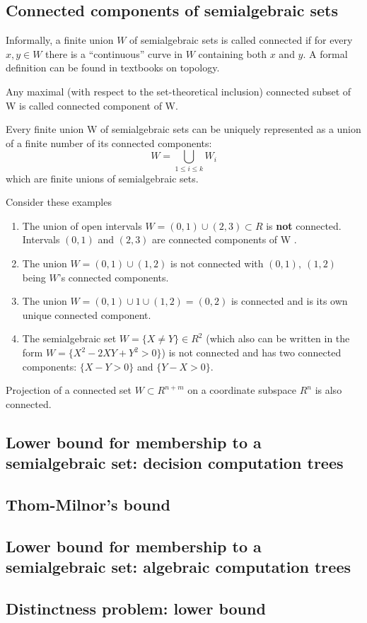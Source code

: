 \subsection{Connected components of semialgebraic sets}
Informally, a finite union $W$ of semialgebraic sets is called connected
if for every $x, y \in W$ there is a “continuous” curve in $W$ containing both $x$ and $y$.
A formal definition can be found in textbooks on topology.

\begin{definition}
    Any maximal (with respect to the set-theoretical inclusion) connected subset of W is called connected component of W.
\end{definition}

\begin{theorem}
    Every finite union W of semialgebraic sets can be uniquely represented as a union of a finite number of its connected components:
    $$W = \bigcup\limits_{1\leq i \leq k} W_i$$
    which are finite unions of semialgebraic sets.
\end{theorem}

\begin{example}
    Consider these examples
    \begin{enumerate}
        \item The union of open intervals $W = (0, 1) \cup (2, 3) \subset R$ is \textbf{not} connected.
            Intervals $(0, 1)$ and $(2, 3)$ are connected components of W .
        \item The union $W = (0, 1) \cup (1, 2)$ is not connected with $(0, 1),\ (1, 2)$ being $W$’s connected components.
        \item The union $W = (0, 1) \cup 1 \cup (1, 2) = (0, 2)$ is connected and is its own unique connected component.
        \item The semialgebraic set $W = \{X \neq Y \} \in R^2$
            (which also can be written in the form $W = \{X^2 − 2XY + Y^2 > 0\}$)
            is not connected and has two connected components: $\{X − Y > 0\}$ and $\{Y − X > 0\}$.
    \end{enumerate}
\end{example}

\begin{theorem}
    Projection of a connected set $W \subset R^{n+m}$ on a coordinate subspace $R^n$ is also connected.
\end{theorem}

\subsection{Lower bound for membership to a semialgebraic set: decision computation trees}
\subsection{Thom-Milnor’s bound}
\subsection{Lower bound for membership to a semialgebraic set: algebraic computation trees}
\subsection{Distinctness problem: lower bound}
